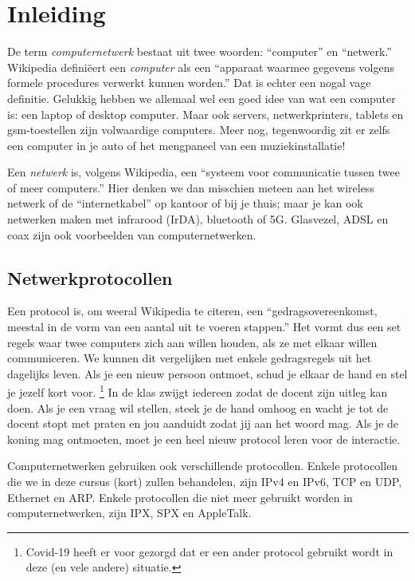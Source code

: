 \section{Inleiding}

De term \emph{computernetwerk} bestaat uit twee woorden: ``computer'' en ``netwerk.''
Wikipedia definiëert een \emph{computer} als een ``apparaat waarmee gegevens volgens formele procedures verwerkt kunnen worden.''
Dat is echter een nogal vage definitie.
Gelukkig hebben we allemaal wel een goed idee van wat een computer is: een laptop of desktop computer.
Maar ook servers, netwerkprinters, tablets en gsm-toestellen zijn volwaardige computers.
Meer nog, tegenwoordig zit er zelfs een computer in je auto of het mengpaneel van een muziekinstallatie!

Een \emph{netwerk} is, volgens Wikipedia, een ``systeem voor communicatie tussen twee of meer computers.''
Hier denken we dan misschien meteen aan het wireless netwerk of de ``internetkabel'' op kantoor of bij je thuis;
maar je kan ook netwerken maken met infrarood (IrDA), bluetooth of 5G.
Glasvezel, ADSL en coax zijn ook voorbeelden van computernetwerken.



\subsection{Netwerkprotocollen}

Een protocol is, om weeral Wikipedia te citeren, een ``gedragsovereenkomst, meestal in de vorm van een aantal uit te voeren stappen.''
Het vormt dus een set regels waar twee computers zich aan willen houden, als ze met elkaar willen communiceren.
We kunnen dit vergelijken met enkele gedragsregels uit het dagelijks leven.
Als je een nieuw persoon ontmoet, schud je elkaar de hand en stel je jezelf kort voor.%
  \footnote{Covid-19 heeft er voor gezorgd dat er een ander protocol gebruikt wordt in deze (en vele andere) situatie.}
In de klas zwijgt iedereen zodat de docent zijn uitleg kan doen.
Als je een vraag wil stellen, steek je de hand omhoog en wacht je tot de docent stopt met praten en jou aanduidt zodat jij aan het woord mag.
Als je de koning mag ontmoeten, moet je een heel nieuw protocol leren voor de interactie.

Computernetwerken gebruiken ook verschillende protocollen.
Enkele protocollen die we in deze cursus (kort) zullen behandelen, zijn
IPv4 en IPv6, TCP en UDP, Ethernet en ARP.
Enkele protocollen die niet meer gebruikt worden in computernetwerken, zijn IPX, SPX en AppleTalk.



